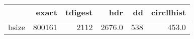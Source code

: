 \begin{tabular}{lrrrrr}
\toprule
{} &   exact &  tdigest &     hdr &   dd &  circllhist \\
\midrule
bsize &  800161 &     2112 &  2676.0 &  538 &       453.0 \\
\bottomrule
\end{tabular}
